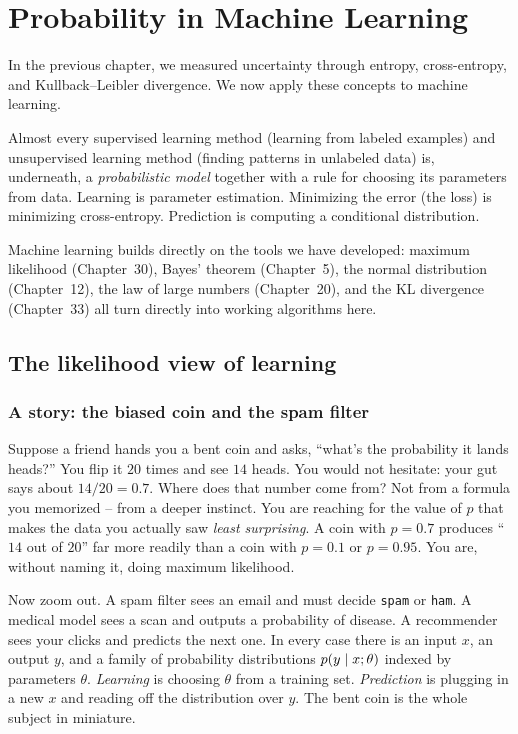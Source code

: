 \chapter{Probability in Machine Learning}

In the previous chapter, we measured uncertainty through entropy, cross-entropy, and
Kullback--Leibler divergence. We now apply these concepts to machine learning.

\begin{focusbox}
Almost every supervised learning method (learning from labeled examples) and unsupervised learning method (finding patterns in unlabeled data) is, underneath, a \emph{probabilistic model} together with a rule for choosing its parameters from data. Learning is parameter estimation. Minimizing the error (the loss) is minimizing cross-entropy. Prediction is computing a conditional distribution.
\end{focusbox}

Machine learning builds directly on the tools we have developed: maximum likelihood (Chapter~30), Bayes' theorem (Chapter~5), the normal distribution (Chapter~12), the law of large numbers (Chapter~20), and the KL divergence (Chapter~33) all turn directly into working algorithms here.

\section{The likelihood view of learning}
\label{ch34:likelihood-view}

\subsection{A story: the biased coin and the spam filter}

Suppose a friend hands you a bent coin and asks, ``what's the probability it
lands heads?'' You flip it $20$ times and see $14$ heads. You would not hesitate:
your gut says about $14/20 = 0.7$. Where does that number come from? Not from a
formula you memorized -- from a deeper instinct. You are reaching for the value of
$p$ that makes the data you actually saw \emph{least surprising}. A coin with
$p=0.7$ produces ``$14$ out of $20$'' far more readily than a coin with $p=0.1$
or $p=0.95$. You are, without naming it, doing maximum likelihood.

Now zoom out. A spam filter sees an email and must decide \texttt{spam} or
\texttt{ham}. A medical model sees a scan and outputs a probability of disease. A
recommender sees your clicks and predicts the next one. In every case there is an
input $x$, an output $y$, and a family of probability distributions
$p(y \mid x; \theta)$ indexed by parameters $\theta$. \emph{Learning} is
choosing $\theta$ from a training set. \emph{Prediction} is plugging in a new $x$
and reading off the distribution over $y$. The bent coin is the whole subject in
miniature.

